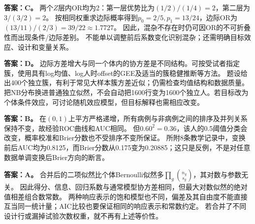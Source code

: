 \textbf{答案：C。} 两个$Z$层内OR均为2：第一层优势比为$(1/2)/(1/4)=2$，第二层为$3/(3/2)=2$。
按相同权重求边际概率得到$p_0=2/5,p_1=13/24$，边际OR为$(13/11)/(2/3)=39/22\approx1.7727$。
因此，混杂不存在时仍可因OR的不可折叠性而出现条件/边际差别。
不能单以调整前后系数变化识别混杂；还需明确目标效应、设计和变量关系。
\par\nobreak\smallskip{}

\textbf{答案：D。} 边际方差增大与同一个体内的协方差是不同结构。可按受试者指定簇，使用具有log均值、log人时offset的GEE及适当的簇稳健推断等方法。
题设给出400个独立簇，有利于常见大样本簇方差近似；仍需检查均值结构和数据质量。
把NB分布换进普通独立似然，不会自动把1600行变为1600个独立人。若目标改为个体条件效应，可讨论随机效应模型，但目标解释也需相应改变。
\par\nobreak\smallskip{}

\textbf{答案：B。} 在$(0,1)$上平方严格递增，所有病例与非病例之间的排序及并列关系保持不变，故经验ROC曲线和AUC相同。
但$0.60^2=0.36$，该人的0.5阈值分类会改变，概率校准和Brier分数也不受排序不变所保证。
所附8条教学记录中，变换前后AUC均为0.8125，而Brier分数从0.175变为0.20885；这只是反例，不是对任意数据单调变换后Brier方向的断言。
\par\nobreak\smallskip{}

\textbf{答案：A。} 合并后的二项似然比个体Bernoulli似然多$\prod_g\binom{n_g}{s_g}$，其对数与参数无关。
因此得分、信息、回归系数与通常模型协方差相同，但最大对数似然的绝对值相差组合数常数。
两种响应表示的饱和模型也不同，偏差及其自由度不能直接互当同一统计量；AIC比较也要保证相同的响应表示和常数约定。
若合并了不同设计行或漏掉试验次数权重，就不再有上述等价性。
\par\nobreak\smallskip{}

